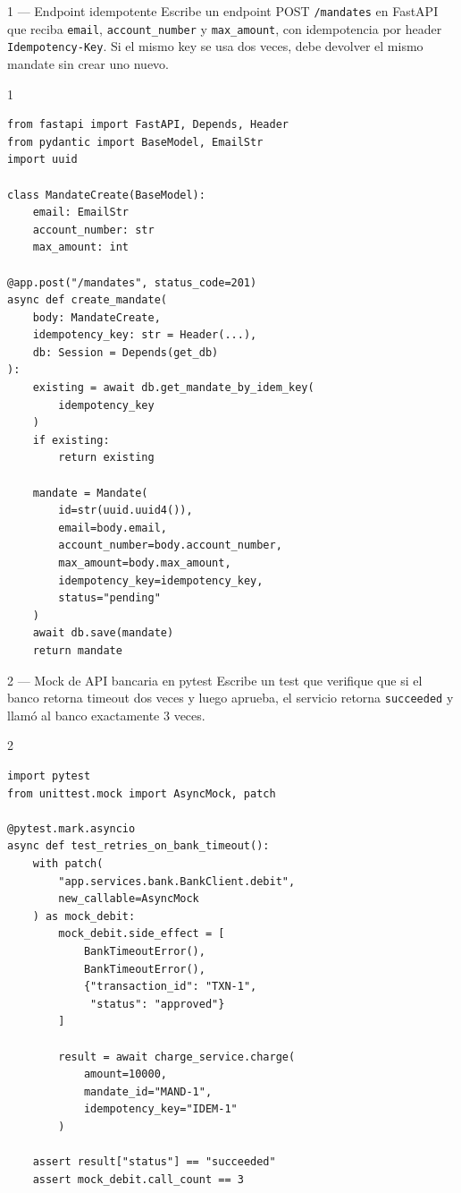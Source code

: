 \documentclass[11pt,a4paper]{article}
\begin{document}
\begin{ejerciciobox}{1 — Endpoint idempotente}
Escribe un endpoint POST \texttt{/mandates} en FastAPI que reciba
\texttt{email}, \texttt{account\_number} y \texttt{max\_amount}, con
idempotencia por header \texttt{Idempotency-Key}. Si el mismo key se
usa dos veces, debe devolver el mismo mandate sin crear uno nuevo.
\end{ejerciciobox}

\begin{solucionbox}{1}
\begin{lstlisting}[style=python]
from fastapi import FastAPI, Depends, Header
from pydantic import BaseModel, EmailStr
import uuid

class MandateCreate(BaseModel):
    email: EmailStr
    account_number: str
    max_amount: int

@app.post("/mandates", status_code=201)
async def create_mandate(
    body: MandateCreate,
    idempotency_key: str = Header(...),
    db: Session = Depends(get_db)
):
    existing = await db.get_mandate_by_idem_key(
        idempotency_key
    )
    if existing:
        return existing

    mandate = Mandate(
        id=str(uuid.uuid4()),
        email=body.email,
        account_number=body.account_number,
        max_amount=body.max_amount,
        idempotency_key=idempotency_key,
        status="pending"
    )
    await db.save(mandate)
    return mandate
\end{lstlisting}
\end{solucionbox}

\begin{ejerciciobox}{2 — Mock de API bancaria en pytest}
Escribe un test que verifique que si el banco retorna timeout dos veces
y luego aprueba, el servicio retorna \texttt{succeeded} y llamó al banco
exactamente 3 veces.
\end{ejerciciobox}

\begin{solucionbox}{2}
\begin{lstlisting}[style=python]
import pytest
from unittest.mock import AsyncMock, patch

@pytest.mark.asyncio
async def test_retries_on_bank_timeout():
    with patch(
        "app.services.bank.BankClient.debit",
        new_callable=AsyncMock
    ) as mock_debit:
        mock_debit.side_effect = [
            BankTimeoutError(),
            BankTimeoutError(),
            {"transaction_id": "TXN-1",
             "status": "approved"}
        ]

        result = await charge_service.charge(
            amount=10000,
            mandate_id="MAND-1",
            idempotency_key="IDEM-1"
        )

    assert result["status"] == "succeeded"
    assert mock_debit.call_count == 3
\end{lstlisting}
\end{solucionbox}
\end{document}
